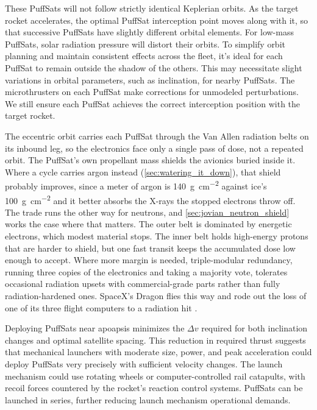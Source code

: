 \documentclass{article}
\newcommand{\deltav}{\Delta v}
\begin{document}
These PuffSats will not follow strictly identical Keplerian orbits. As the target rocket accelerates, the optimal PuffSat interception point moves along with it, so that successive PuffSats have slightly different orbital elements.
For low-mass PuffSats, solar radiation pressure will distort their orbits. To simplify orbit planning and maintain consistent effects across the fleet, it's ideal for each PuffSat to remain outside the shadow of the others. This may necessitate slight variations in orbital parameters, such as inclination, for nearby PuffSats. The microthrusters on each PuffSat make corrections for unmodeled perturbations. We still ensure each PuffSat achieves the correct interception position with the target rocket. 

The eccentric orbit carries each PuffSat through the Van Allen radiation belts \cite{li2019vanallen} on its inbound leg, so the electronics face only a single pass of dose, not a repeated orbit. The PuffSat's own propellant mass shields the avionics buried inside it. Where a cycle carries argon instead (\autoref{sec:watering_it_down}), that shield probably improves, since a meter of argon is \SI{140}{\gram\per\square\centi\meter} against ice's \SI{100}{\gram\per\square\centi\meter} and it better absorbs the X-rays the stopped electrons throw off. The trade runs the other way for neutrons, and \autoref{sec:jovian_neutron_shield} works the case where that matters. The outer belt is dominated by energetic electrons, which modest material stops. The inner belt holds high-energy protons that are harder to shield, but one fast transit keeps the accumulated dose low enough to accept. Where more margin is needed, triple-modular redundancy, running three copies of the electronics and taking a majority vote, tolerates occasional radiation upsets with commercial-grade parts rather than fully radiation-hardened ones. SpaceX's Dragon flies this way and rode out the loss of one of its three flight computers to a radiation hit \cite{aviationweek2012dragon}.

Deploying PuffSats near apoapsis minimizes the $\deltav$ required for both inclination changes and optimal satellite spacing. This reduction in required thrust suggests that mechanical launchers with moderate size, power, and peak acceleration could deploy PuffSats very precisely with sufficient velocity changes. The launch mechanism could use rotating wheels or computer-controlled rail catapults, with recoil forces countered by the rocket's reaction control systems. PuffSats can be launched in series, further reducing launch mechanism operational demands.
\end{document}
